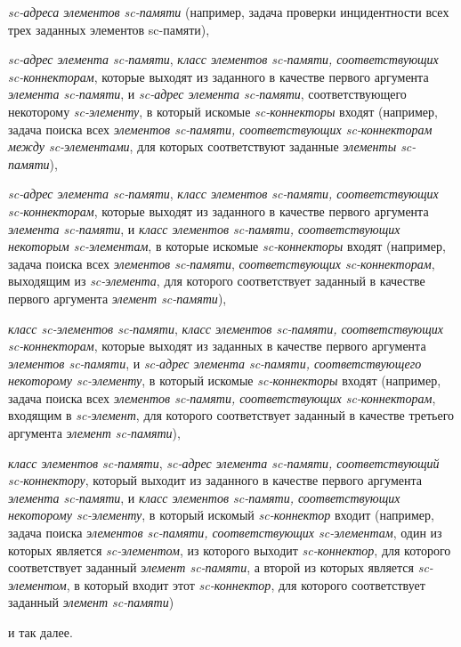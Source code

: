 \begin{SCn}
\begin{scnsubstruct}
\begin{scnsubstruct}
\begin{scnsubstruct}
\begin{scnsubstruct}
\begin{scnsubstruct}
{	\begin{scnitemize}
		\item \textit{sc-адреса элементов sc-памяти} (например, задача проверки инцидентности всех трех заданных элементов sc-памяти),
		\item \textit{sc-адрес элемента sc-памяти}, \textit{класс элементов sc-памяти, соответствующих sc-коннекторам\scnsupergroupsign}, которые выходят из заданного в качестве первого аргумента \textit{элемента sc-памяти}, и \textit{sc-адрес элемента sc-памяти}, соответствующего некоторому \textit{sc-элементу}, в который искомые \textit{sc-коннекторы} входят (например, задача поиска всех \textit{элементов sc-памяти, соответствующих sc-коннекторам между sc-элементами}, для которых соответствуют заданные \textit{элементы sc-памяти}),
		\item \textit{sc-адрес элемента sc-памяти}, \textit{класс элементов sc-памяти, соответствующих sc-коннекторам\scnsupergroupsign}, которые выходят из заданного в качестве первого аргумента \textit{элемента sc-памяти}, и \textit{класс элементов sc-памяти, соответствующих некоторым sc-элементам\scnsupergroupsign}, в которые искомые \textit{sc-коннекторы} входят (например, задача поиска всех \textit{элементов sc-памяти}, \textit{соответствующих sc-коннекторам}, выходящим из \textit{sc-элемента}, для которого соответствует заданный в качестве первого аргумента \textit{элемент sc-памяти}),
		\item \textit{класс sc-элементов sc-памяти\scnsupergroupsign}, \textit{класс элементов sc-памяти, соответствующих sc-коннекторам\scnsupergroupsign}, которые выходят из заданных в качестве первого аргумента \textit{элементов sc-памяти}, и \textit{sc-адрес элемента sc-памяти, соответствующего некоторому sc-элементу}, в который искомые \textit{sc-коннекторы} входят (например, задача поиска всех \textit{элементов sc-памяти, соответствующих sc-коннекторам}, входящим в \textit{sc-элемент}, для которого соответствует заданный в качестве третьего аргумента \textit{элемент sc-памяти}),
		\item \textit{класс элементов sc-памяти\scnsupergroupsign}, \textit{sc-адрес элемента sc-памяти, соответствующий sc-коннектору}, который выходит из заданного в качестве первого аргумента \textit{элемента sc-памяти}, и \textit{класс элементов sc-памяти, соответствующих некоторому sc-элементу\scnsupergroupsign}, в который искомый \textit{sc-коннектор} входит (например, задача поиска \textit{элементов sc-памяти, соответствующих sc-элементам}, один из которых является \textit{sc-элементом}, из которого выходит \textit{sc-коннектор}, для которого соответствует заданный \textit{элемент sc-памяти}, а второй из которых является \textit{sc-элементом}, в который входит этот \textit{sc-коннектор}, для которого соответствует заданный \textit{элемент sc-памяти})
		\item и так далее.
	\end{scnitemize}}


\end{scnsubstruct}
\end{scnsubstruct}
\end{scnsubstruct}
\end{scnsubstruct}
\end{scnsubstruct}
\end{SCn}
